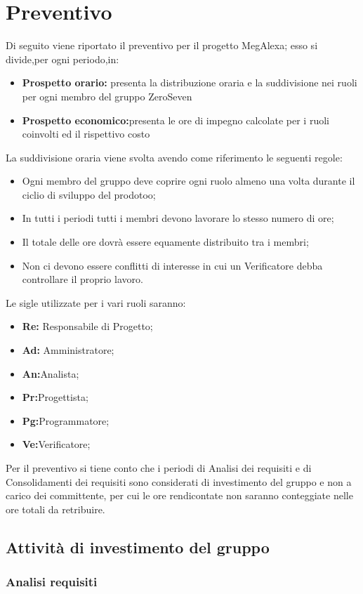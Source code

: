 \chapter{Preventivo}
Di seguito viene riportato il preventivo per il progetto MegAlexa; esso si divide,per ogni periodo,in:
\begin{itemize}
	\item \textbf{Prospetto orario:} presenta la distribuzione oraria e la suddivisione nei ruoli per ogni membro del gruppo ZeroSeven
	\item \textbf{Prospetto economico:}presenta le ore di impegno calcolate per i ruoli coinvolti ed il rispettivo costo 
\end{itemize}
La suddivisione oraria viene svolta avendo come riferimento le seguenti regole:
\begin{itemize}
	\item Ogni membro del gruppo deve coprire ogni ruolo almeno una volta durante il ciclio di sviluppo del prodotoo;
	\item In tutti i periodi tutti i membri devono lavorare lo stesso numero di ore;
	\item Il totale delle ore dovrà essere equamente distribuito tra i membri;
	\item Non ci devono essere conflitti di interesse in cui un Verificatore debba controllare il proprio lavoro.
\end{itemize}
Le sigle utilizzate per i vari ruoli saranno:
\begin{itemize}
	\item \textbf{Re:} Responsabile di Progetto;
	\item \textbf{Ad:} Amministratore;
	\item \textbf{An:}Analista;
	\item \textbf{Pr:}Progettista;
	\item \textbf{Pg:}Programmatore;
	\item \textbf{Ve:}Verificatore;
\end{itemize}

Per il preventivo si tiene conto che i periodi di Analisi dei requisiti e di Consolidamenti dei requisiti sono considerati di investimento del gruppo e  non a carico dei committente, per cui  le ore rendicontate non saranno conteggiate nelle ore totali da retribuire.
\newpage
\section{Attività di  investimento del gruppo}
\subsection{Analisi requisiti}
